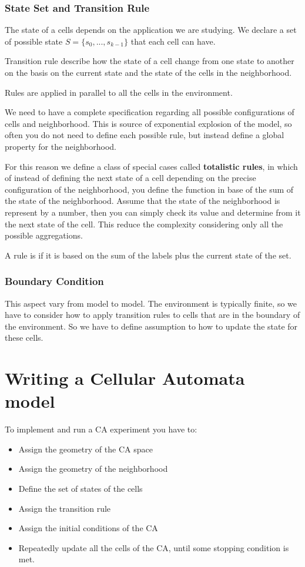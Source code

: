 \subsubsection{State Set and Transition Rule}
The state of a cells depends on the application we are studying. We declare a set of possible state $S=\{s_{0}, ...,s_{k-1}\} $ that each cell can have.\par
Transition rule describe how the state of a cell change from one state to another on the basis on the current state and the state of the cells in the neighborhood.\par
Rules are applied in parallel to all the cells in the environment.\par
We need to have a complete specification regarding all possible configurations of cells and neighborhood. This is source of exponential explosion of the model, so often you do not need to define each possible rule, but instead define a global property for the neighborhood.\par
For this reason we define a class of special cases called \textbf{totalistic rules}, in which of instead of defining the next state of a cell depending on the precise configuration of the neighborhood, you define the function in base of the sum of the state of the neighborhood. Assume that the state of the neighborhood is represent by a number, then you can simply check its value and determine from it the next state of the cell. This reduce the complexity considering only all the possible aggregations.\par

A rule is  if it is based on the sum of the labels plus the current state of the set.


\subsubsection{Boundary Condition}
This aspect vary from model to model. The environment is typically finite, so we have to consider how to apply transition rules to cells that are in the boundary of the environment. So we have to define assumption to how to update the state for these cells.

\section{Writing a Cellular Automata model}
To implement and run a CA experiment you have to:
\begin{itemize}
    \item  Assign the geometry of the CA space
    \item Assign the geometry of the neighborhood
    \item Define the set of states of the cells
    \item Assign the transition rule
    \item Assign the initial conditions of the CA
    \item Repeatedly update all the cells of the CA, until some stopping condition is met.
\end{itemize}
